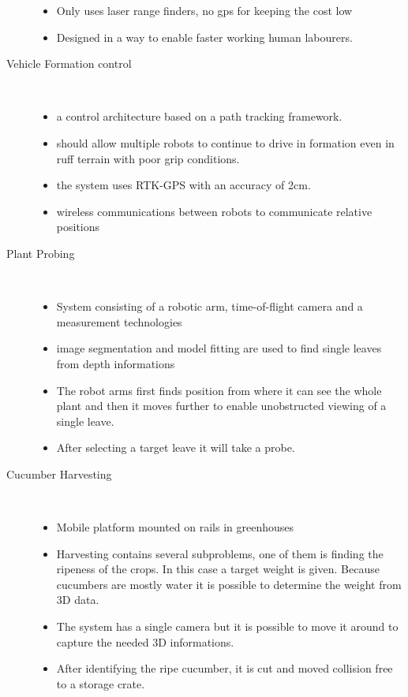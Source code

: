 \documentclass{article}
\begin{document}
\begin{description}
\begin{itemize}
        \item Only uses laser range finders, no gps for keeping the cost low
        \item Designed in a way to enable faster working human labourers.
    \end{itemize} 
    \item[Vehicle Formation control] \
    \begin{itemize}
        \item a control architecture based on a path tracking framework. 
        \item should allow multiple robots to continue to drive in formation even in ruff terrain with poor grip conditions.
        \item the system uses RTK-GPS with an accuracy of 2cm.
        \item wireless communications between robots to communicate relative positions
    \end{itemize} 
    \item[Plant Probing] \
    \begin{itemize}
        \item System consisting of a robotic arm, time-of-flight camera and a measurement technologies
        \item image segmentation and model fitting are used to find single leaves from depth informations
        \item The robot arms first finds position from where it can see the whole plant and then it moves further to enable unobstructed viewing of a single leave.
        \item After selecting a target leave it will take a probe.
    \end{itemize} 
    \item[Cucumber Harvesting] \
    \begin{itemize}
        \item Mobile platform mounted on rails in greenhouses
        \item Harvesting contains several subproblems, one of them is finding the ripeness of the crops. In this case a target weight is given. Because cucumbers are mostly water it is possible to determine the weight from 3D data.
        \item The system has a single camera but it is possible to move it around to capture the needed 3D informations.
        \item After identifying the ripe cucumber, it is cut and moved collision free to a storage crate. 
    \end{itemize} 

\end{description} 
\end{document}
